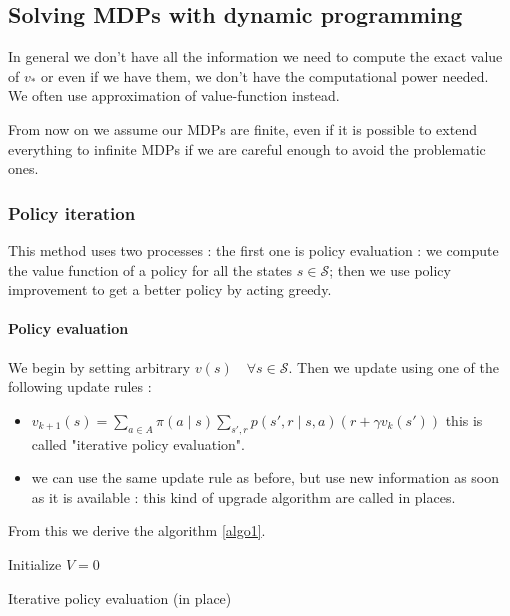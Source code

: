 \documentclass[14pt,a4paper]{article}
\theoremstyle{definition}
\begin{document}
\subsection{Solving MDPs with dynamic programming}

In general we don't have all the information we need to compute the exact value of $v_{*}$ or even if we have them, we don't have the computational 
power needed. We often use approximation of value-function instead.


From now on we assume our MDPs are finite, even if it is possible to extend everything to infinite MDPs if we are careful enough to avoid the problematic ones. \citep{Sutton}

\subsubsection{Policy iteration}

This method uses two processes : the first one is policy evaluation : we compute the value function of a policy for all the states $s \in \mathcal{S} $; then we use policy improvement to get a better policy by acting greedy.
\paragraph{Policy evaluation} 


We begin by setting arbitrary $v(s) \quad \forall s \in \mathcal{S}$.
Then we update using one of the following update rules : 

\begin{itemize}
\item $v_{k+1}(s)=\sum_{a \in A}\pi(a \mid s)\sum_{s',r}p(s',r\mid s,a)(r+\gamma v_k(s'))$ \quad this is called "iterative policy evaluation".
\item we can use the same update rule as before, but use new information as soon as it is available : this kind of upgrade algorithm are called in places.
\end{itemize}

From this we derive the algorithm \ref{algo1}.


\begin{algorithm}
\label{algo1}

    Initialize $V = 0$\\
    
    \caption{Iterative policy evaluation (in place)}
\end{algorithm}
\end{document}

